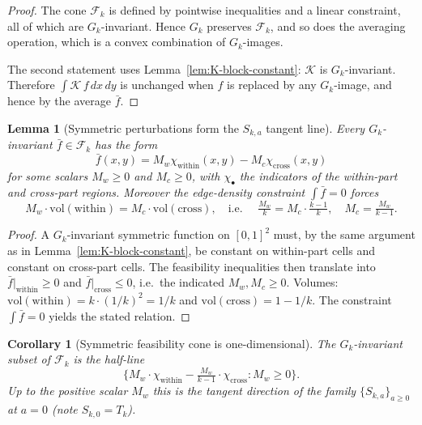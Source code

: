 \documentclass[11pt]{amsart}
\newtheorem{lemma}[theorem]{Lemma}
\newtheorem{corollary}[theorem]{Corollary}
\theoremstyle{definition}
\newcommand{\1}{\mathbf 1}
\newcommand{\dd}{\,d}
\begin{document}
\begin{proof}
The cone $\mathcal F_k$ is defined by pointwise inequalities and a linear
constraint, all of which are $G_k$-invariant.  Hence $G_k$ preserves $\mathcal F_k$,
and so does the averaging operation, which is a convex combination of
$G_k$-images.

The second statement uses Lemma~\ref{lem:K-block-constant}: $\mathcal K$ is
$G_k$-invariant.  Therefore $\int \mathcal K\, f\dd x\dd y$ is unchanged when $f$ is
replaced by any $G_k$-image, and hence by the average $\bar f$.
\end{proof}

\begin{lemma}[Symmetric perturbations form the $S_{k,a}$ tangent line]
\label{lem:symmetric-perturbations}
Every $G_k$-invariant $\bar f\in\mathcal F_k$ has the form
\[
   \bar f(x,y) = M_w \chi_{\mathrm{within}}(x,y) - M_c \chi_{\mathrm{cross}}(x,y)
\]
for some scalars $M_w\ge 0$ and $M_c\ge 0$, with $\chi_\bullet$ the indicators
of the within-part and cross-part regions.  Moreover the edge-density
constraint $\int \bar f = 0$ forces
\[
   M_w \cdot \mathrm{vol}(\mathrm{within}) = M_c \cdot \mathrm{vol}(\mathrm{cross}),
   \quad\text{i.e.\ }\quad
   \tfrac{M_w}{k} = M_c\cdot \tfrac{k-1}{k},
   \quad
   M_c = \tfrac{M_w}{k-1}.
\]
\end{lemma}

\begin{proof}
A $G_k$-invariant symmetric function on $[0,1]^2$ must, by the same argument
as in Lemma~\ref{lem:K-block-constant}, be constant on within-part cells
and constant on cross-part cells.  The feasibility inequalities then translate
into $\bar f|_{\mathrm{within}}\ge 0$ and $\bar f|_{\mathrm{cross}}\le 0$, i.e.\
the indicated $M_w, M_c\ge 0$.  Volumes:
$\mathrm{vol}(\mathrm{within}) = k\cdot(1/k)^2 = 1/k$ and
$\mathrm{vol}(\mathrm{cross}) = 1 - 1/k$.  The constraint $\int \bar f = 0$
yields the stated relation.
\end{proof}

\begin{corollary}[Symmetric feasibility cone is one-dimensional]
\label{cor:1d-cone}
The $G_k$-invariant subset of $\mathcal F_k$ is the half-line
\[
   \{M_w\cdot \chi_{\mathrm{within}} - \tfrac{M_w}{k-1}\cdot\chi_{\mathrm{cross}}
   : M_w\ge 0\}.
\]
Up to the positive scalar $M_w$ this is the tangent direction of the family
$\{S_{k,a}\}_{a\ge 0}$ at $a=0$ (note $S_{k,0}=T_k$).
\end{corollary}
\end{document}
